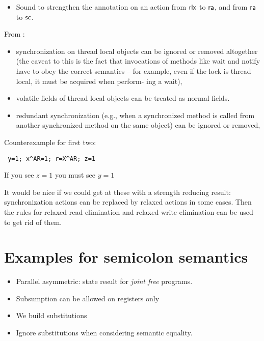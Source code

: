 \begin{itemize}
\item Sound to strengthen the annotation on an action from ${\mathsf{rlx}}$ to
  ${\mathsf{ra}}$, and from ${\mathsf{ra}}$ to ${\mathsf{sc}}$.
\end{itemize}

From \cite{Manson:2005:JMM:1047659.1040336}:
\begin{itemize}
\item synchronization on thread local objects can be ignored or removed
  altogether (the caveat to this is the fact that invocations of methods like
  wait and notify have to obey the correct semantics – for example, even if
  the lock is thread local, it must be acquired when perform- ing a wait),
   
\item volatile fields of thread local objects can be treated as normal
  fields.

\item redundant synchronization (e.g., when a synchronized method is called
  from another synchronized method on the same object) can be ignored or
  removed,
  
\end{itemize}

Counterexample for first two:
\begin{verbatim}
 y=1; x^AR=1; r=X^AR; z=1
\end{verbatim}
If you see $z=1$ you must see $y=1$

It would be nice if we could get at these with a strength reducing result:
synchronization actions can be replaced by relaxed actions in some cases.
Then the rules for relaxed read elimination and relaxed write elimination can
be used to get rid of them.

\section{Examples for semicolon semantics}

\begin{itemize}
\item Parallel asymmetric: state result for \emph{joint free} programs. 
\item Subsumption can be allowed on registers only
\item We build substitutions
\item Ignore substitutions when considering semantic equality.
\end{itemize}


